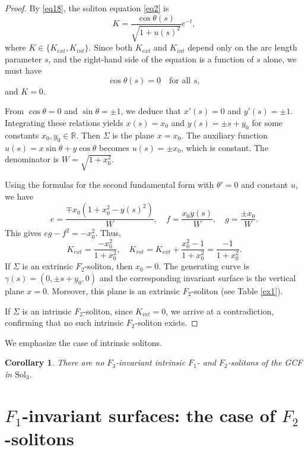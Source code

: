 \documentclass[a4paper,12pt]{amsart}
\theoremstyle{plain}
\newtheorem{corollary}[theorem]{Corollary}
\theoremstyle{definition}
\def\r{\mathbb R}
\def\sol{\text{Sol}_3}
\begin{document}
\begin{proof}
By \eqref{eq18}, the soliton equation \eqref{eq2} is
$$K = \frac{\cos\theta(s)}{\sqrt{1+u(s)^2}}e^{-t},$$
where $K \in \{K_{ext}, K_{int}\}$. Since both $K_{ext}$ and $K_{int}$ depend only on the arc length parameter $s$, and the right-hand side of the equation is a function of $s$ alone, we must have
$$\cos\theta(s) = 0 \quad \text{for all } s,$$
and $K=0$. 

From $\cos\theta = 0$ and $\sin\theta = \pm 1$, we deduce that $x'(s) = 0$ and $y'(s) = \pm 1$. Integrating these relations yields $x(s) = x_0$ and $y(s) = \pm s + y_0$ for some constants $x_0, y_0 \in \r$. Then $\Sigma$ is the plane $x=x_0$. The auxiliary function $u(s) = x\sin\theta + y\cos\theta$ becomes $u(s) = \pm x_0$, which is constant. The denominator is $W = \sqrt{1+x_0^2}$.

Using the formulas for the second fundamental form with $\theta' = 0$ and constant $u$, we have
$$e = \frac{\mp x_0(1 + x_0^2 - y(s)^2)}{W}, \quad f = \frac{x_0 y(s)}{W}, \quad g = \frac{\pm x_0}{W}.$$
This gives $eg - f^2 = -x_0^2$. Thus, 
$$K_{ext} = \frac{-x_0^2}{1+x_0^2}, \quad K_{int} = K_{ext} + \frac{x_0^2 - 1}{1+x_0^2} = \frac{-1}{1+x_0^2}.$$
 If $\Sigma$ is an extrinsic $F_2$-soliton, then $x_0=0$. The generating curve is $\gamma(s) = (0, \pm s + y_0, 0)$ and the corresponding invariant surface is the vertical plane $x = 0$. Moreover, this plane is an extrinsic $F_2$-soliton (see Table \ref{ex1}).

 If $\Sigma$ is an intrinsic $F_2$-soliton, since $K_{int} = 0$, we arrive at a contradiction, confirming that no such intrinsic $F_2$-soliton exists.
\end{proof}
 
 We emphasize the case of intrinsic solitons.
 
 \begin{corollary} There are no $F_3$-invariant intrinsic $F_1$- and $F_2$-solitons of the GCF in $\sol$.
 \end{corollary}
 

 \section{$F_1$-invariant surfaces: the case of $F_2$-solitons}\label{s5}
\end{document}
